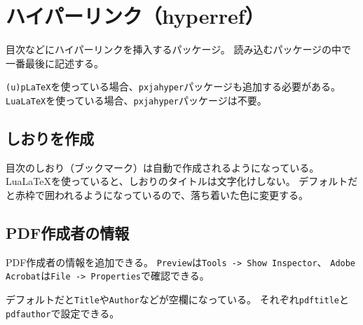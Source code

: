 \section{ハイパーリンク（hyperref）}

目次などにハイパーリンクを挿入するパッケージ。
読み込むパッケージの中で一番最後に記述する。

\texttt{(u)pLaTeX}を使っている場合、\texttt{pxjahyper}パッケージも追加する必要がある。
\texttt{LuaLaTeX}を使っている場合、\texttt{pxjahyper}パッケージは不要。

\subsection{しおりを作成}

目次のしおり（ブックマーク）は自動で作成されるようになっている。
LuaLaTeXを使っていると、しおりのタイトルは文字化けしない。
デフォルトだと赤枠で囲われるようになっているので、落ち着いた色に変更する。

\subsection{PDF作成者の情報}

PDF作成者の情報を追加できる。
\texttt{Preview}は\texttt{Tools -> Show Inspector}、
\texttt{Adobe Acrobat}は\texttt{File -> Properties}で確認できる。

デフォルトだと\texttt{Title}や\texttt{Author}などが空欄になっている。
それぞれ\texttt{pdftitle}と\texttt{pdfauthor}で設定できる。
